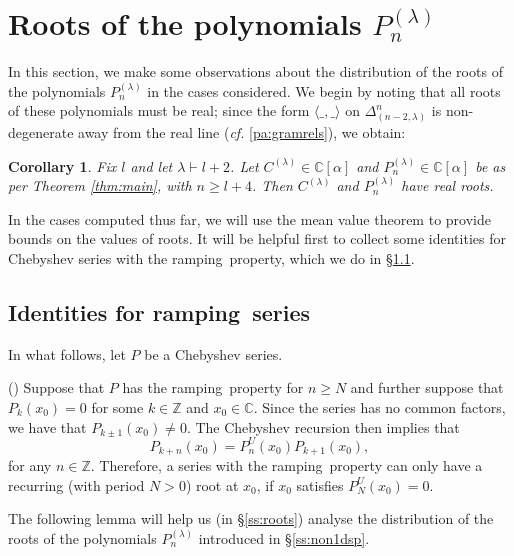 \documentclass{article}
\newcommand{\ppm}[1]{\textcolor{red}{#1}}
\newtheorem{corollary}{Corollary}[theorem]
\theoremstyle{definition}
\newcommand{\beq}{\begin{equation}}
\newcommand{\eq}{\end{equation}}
\newcommand{\mdef}{\refstepcounter{theorem}       \medskip \noindent ({\bf \thetheorem}) }
\newcommand{\ramping}{ramping}
\def\a{\alpha}
\def\l{\lambda}
\def\C{\mathbb{C}}
\def\Z{\mathbb{Z}}
\numberwithin{equation}{subsection}
\begin{document}
\section{Roots of the polynomials $P^{(\l)}_n$}\label{s:roots}
In this section, we make some observations about the distribution of the roots of the polynomials $P^{(\l)}_n$ in the cases considered. We begin by noting that all roots of these polynomials must be real; since the form $\langle \_,\_ \rangle$ on $\Delta^{n}_{(n-2,\l)}$ is non-degenerate away from the real line (\textit{cf.} \ref{pa:gramrels}), we obtain:
\begin{corollary} Fix $l$ and let $\l\vdash l+2$. Let $C^{(\l)}\in \C[\a]$ and $P^{(\l)}_n\in \C[\a]$ be as per Theorem \ref{thm:main}, with $n\geq l+4$. Then $C^{(\l)}$ and $P^{(\l)}_n$ have real roots.   
\end{corollary}
In the cases computed thus far, we will use the mean value theorem to provide bounds on the values of roots. It will be helpful first to collect some identities for Chebyshev series with the \ramping\ property, which we do in \S\ref{ss:rampingroots}.


\subsection{Identities for \ramping\ series}\label{ss:rampingroots}
In what follows, let $P$ be a Chebyshev series.

\mdef\label{pa:roots} 
Suppose that $P$ has the \ramping\ property for $n\geq N$ and further suppose that $P_{k}(x_0)=0$ for some $k\in \Z$ and $x_0\in \C$. Since the series has no common factors, we have that $P_{k\pm 1}(x_0)\neq 0$. The Chebyshev recursion then implies that 
\beq
    P_{k+n}(x_0)=P^U_n(x_0)P_{k+1}(x_0),  \label{eq:chebyx0}
\eq
for any $n\in \Z$. Therefore, a series with the \ramping\ property can only have a recurring (with period $N>0$) root at $x_0$, if $x_0$ satisfies $P^U_N(x_0)=0$. 

The following lemma will help us (in \S\ref{ss:roots}) analyse the distribution of the roots of the polynomials $P^{(\l)}_n$ introduced in \S\ref{ss:non1dsp}.
\end{document}
